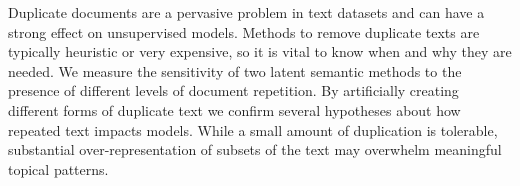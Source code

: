 Duplicate documents are a pervasive problem in text datasets and can have a strong effect on unsupervised models. Methods to remove duplicate texts are typically heuristic or very expensive, so it is vital to know when and why they are needed. We measure the sensitivity of two latent semantic methods to the presence of different levels of document repetition. By artificially creating different forms of duplicate text we confirm several hypotheses about how repeated text impacts models. While a small amount of duplication is tolerable, substantial over-representation of subsets of the text may overwhelm meaningful topical patterns.
